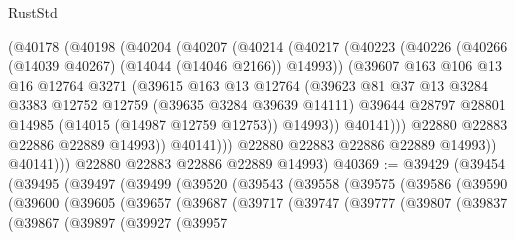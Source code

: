 \begin{lexlean}{RustStd}
\begin{coremodule}
                (@40178
                  (@40198
                    (@40204
                      (@40207
                        (@40214
                          (@40217
                            (@40223
                              (@40226 (@40266 (@14039 @40267) (@14044 (@14046 @2166)) @14993))
                              (@39607
                                @163
                                @106
                                @13
                                @16
                                @12764
                                @3271
                                (@39615
                                  @163
                                  @13
                                  @12764
                                  (@39623
                                    @81
                                    @37
                                    @13
                                    @3284
                                    @3383
                                    @12752
                                    @12759
                                    (@39635 @3284 @39639 @14111)
                                    @39644
                                    @28797
                                    @28801
                                    @14985
                                    (@14015 (@14987 @12759 @12753))
                                    @14993))
                                @40141)))
                          @22880
                          @22883
                          @22886
                          @22889
                          @14993))
                      @40141)))
                @22880
                @22883
                @22886
                @22889
                @14993))
            @40141)))
      @22880
      @22883
      @22886
      @22889
      @14993)
@40369 := @39429
    (@39454
      (@39495
        (@39497
          (@39499
            (@39520
              (@39543
                (@39558
                  (@39575
                    (@39586
                      (@39590
                        (@39600
                          (@39605
                            (@39657
                              (@39687
                                (@39717
                                  (@39747
                                    (@39777
                                      (@39807
                                        (@39837
                                          (@39867
                                            (@39897
                                              (@39927
                                                (@39957

\end{coremodule}
\end{lexlean}

